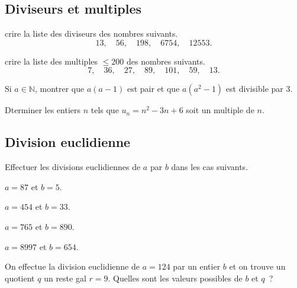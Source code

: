\documentclass[a4paper,fleqn,openany]{trmbook}
\newcommand*{\N}{\mathbb{N}}
\begin{document}
\begin{listeexercices}

\subsection{Diviseurs et multiples}

\begin{exercice}
crire la liste des diviseurs des nombres suivants.
\[13, \quad 56, \quad 198, \quad 6754, \quad 12553.\]
\end{exercice}

\begin{exercice}
crire la liste des multiples $\leq 200$ des nombres suivants.
\[7, \quad 36, \quad 27, \quad 89, \quad 101, \quad 59, \quad 13.\]
\end{exercice}

\begin{exercice}
Si $a \in \N$, montrer que $a(a-1)$ est pair et que $a(a^2-1)$ est divisible par $3$.
\end{exercice}

\begin{exercice}
Dterminer les entiers $n$ tels que $u_n = n^2-3n+6$ soit un multiple de $n$.
\end{exercice}

\subsection{Division euclidienne}

\begin{exercice}
Effectuer les divisions euclidiennes de $a$ par $b$ dans les cas suivants.
\begin{multicols}{2}
\begin{questions}
    \item $a = 87$ et $b = 5$.
    \item $a = 454$ et $b = 33$.
    \item $a = 765$ et $b = 890$.
    \item $a = 8997$ et $b = 654$.
\end{questions}
\end{multicols}
\end{exercice}

\begin{exercice}
On effectue la division euclidienne de $a = 124$ par un entier $b$ et on trouve un quotient $q$ un reste gal  $r = 9$. Quelles sont les valeurs possibles de $b$ et $q$~?
\end{exercice}


\end{listeexercices}
\end{document}

